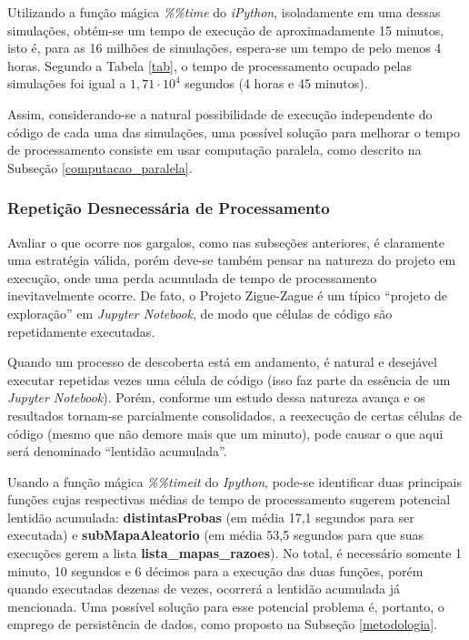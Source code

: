 \documentclass[12pt]{article}
\newcommand{\aspas}[1]{``#1''} %
\begin{document}
Utilizando a função mágica \textit{\%\%time} do \textit{iPython}, isoladamente em uma dessas simulações, obtém-se um tempo de execução de aproximadamente 15 minutos, isto é, para as 16 milhões de simulações, espera-se um tempo de pelo menos 4 horas. Segundo a Tabela \ref{tab}, o tempo de processamento ocupado pelas simulações foi igual a $1,71 \cdot 10^4$ segundos (4 horas e 45 minutos). 

Assim, considerando-se a natural possibilidade de execução independente do código de cada uma das simulações, uma possível solução para melhorar o tempo de processamento consiste em usar computação paralela, como descrito na Subseção \ref{computacao_paralela}.

\subsubsection{Repetição Desnecessária de Processamento}
\label{repeticao}


Avaliar o que ocorre nos gargalos, como nas subseções anteriores, é claramente uma estratégia válida, porém deve-se também pensar na natureza do projeto em execução, onde uma perda acumulada de tempo de processamento inevitavelmente ocorre. De fato, o Projeto Zigue-Zague é um típico \aspas{projeto de exploração} em \textit{Jupyter Notebook}, de modo que células de código são repetidamente executadas.

Quando um processo de descoberta está em andamento, é natural e desejável executar repetidas vezes uma célula de código (isso faz parte da essência de um \textit{Jupyter Notebook}). Porém, conforme um estudo dessa natureza avança e os resultados tornam-se parcialmente consolidados, a reexecução de certas células de código (mesmo que não demore mais que um minuto), pode causar o que aqui será denominado \aspas{lentidão acumulada}.

Usando a função mágica \textit{\%\%timeit} do \textit{Ipython}, pode-se identificar duas principais funções cujas respectivas médias de tempo de processamento sugerem potencial lentidão acumulada: \textbf{distintasProbas} (em média 17,1 segundos para ser executada) e \textbf{subMapaAleatorio} (em média 53,5 segundos para que suas execuções gerem a lista \textbf{lista\_mapas\_razoes}). No total, é necessário somente 1 minuto, 10 segundos e 6 décimos para a execução das duas funções, porém quando executadas dezenas de vezes, ocorrerá a lentidão acumulada já mencionada. Uma possível solução para esse potencial problema é, portanto, o emprego de persistência de dados, como proposto na Subseção \ref{metodologia}.
\end{document}
